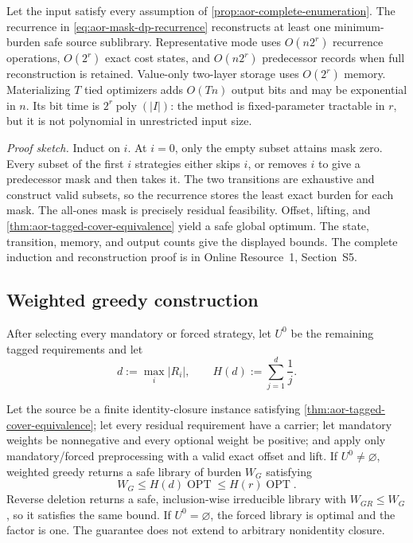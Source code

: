 \begin{theorem}
\label{thm:aor-requirement-mask-dp}
Let the input satisfy every assumption of
\cref{prop:aor-complete-enumeration}.  The recurrence in
\eqref{eq:aor-mask-dp-recurrence} reconstructs at least one minimum-burden safe
source sublibrary.  Representative mode uses \(O(n2^r)\) recurrence operations,
\(O(2^r)\) exact cost states, and \(O(n2^r)\) predecessor records when full
reconstruction is retained.  Value-only two-layer storage uses \(O(2^r)\)
memory.  Materializing \(T\) tied optimizers adds \(O(Tn)\) output bits and may
be exponential in \(n\).  Its bit time is
\(2^r\operatorname{poly}(|I|)\): the method is fixed-parameter tractable in
\(r\), but it is not polynomial in unrestricted input size.
\end{theorem}

\noindent\emph{Proof sketch.}
Induct on \(i\).  At \(i=0\), only the empty subset attains mask zero.  Every
subset of the first \(i\) strategies either skips \(i\), or removes \(i\) to
give a predecessor mask and then takes it.  The two transitions are exhaustive
and construct valid subsets, so the recurrence stores the least exact burden
for each mask.  The all-ones mask is precisely residual feasibility.  Offset,
lifting, and \cref{thm:aor-tagged-cover-equivalence} yield a safe global
optimum.  The state, transition, memory, and output counts give the displayed
bounds.  The complete induction and reconstruction proof is in Online
Resource~1, Section~S5.

\subsection{Weighted greedy construction}
\label{subsec:aor-weighted-greedy}

After selecting every mandatory or forced strategy, let \(U^0\) be the
remaining tagged requirements and let
\[
 d:=\max_i |R_i|,\qquad H(d):=\sum_{j=1}^d\frac1j.
\]

\begin{theorem}
\label{thm:aor-weighted-greedy}
Let the source be a finite identity-closure instance satisfying
\cref{thm:aor-tagged-cover-equivalence}; let every residual requirement have a
carrier; let mandatory weights be nonnegative and every optional weight be
positive; and apply only mandatory/forced preprocessing with a valid exact
offset and lift.  If \(U^0\neq\varnothing\), weighted greedy returns a safe
library of burden \(W_G\) satisfying
\[
 W_G\leq H(d)\operatorname{OPT}\leq H(r)\operatorname{OPT}.
\]
Reverse deletion returns a safe, inclusion-wise irreducible library with
\(W_{GR}\leq W_G\), so it satisfies the same bound.  If \(U^0=\varnothing\),
the forced library is optimal and the factor is one.  The guarantee does not
extend to arbitrary nonidentity closure.
\end{theorem}

